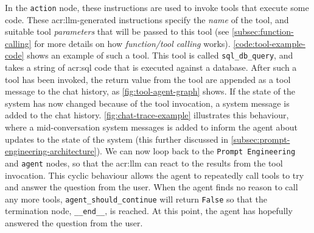 In the \texttt{action} node, these instructions are used to invoke tools that execute some code. These \acrshort{acr:llm}-generated instructions specify the \textit{name} of the tool, and suitable tool \textit{parameters} that will be passed to this tool (see \autoref{subsec:function-calling} for more details on how \textit{function/tool calling} works). \autoref{code:tool-example-code} shows an example of such a tool. This tool is called \texttt{sql\_db\_query}, and takes a string of \acrshort{acr:sql} code that is executed against a database. After such a tool has been invoked, the return value from the tool are appended as a tool message to the chat history, as \autoref{fig:tool-agent-graph} shows. If the state of the system has now changed because of the tool invocation, a system message is added to the chat history. \autoref{fig:chat-trace-example} illustrates this behaviour, where a mid-conversation system messages is added to inform the agent about updates to the state of the system (this further discussed in \autoref{subsec:prompt-engineering-architecture}). We can now loop back to the \texttt{Prompt Engineering} and \texttt{agent} nodes, so that the \acrshort{acr:llm} can react to the results from the tool invocation. This cyclic behaviour allows the agent to repeatedly call tools to try and answer the question from the user. When the agent finds no reason to call any more tools, \texttt{agent\_should\_continue} will return \texttt{False} so that the termination node, \texttt{\_\_end\_\_}, is reached. At this point, the agent has hopefully answered the question from the user.

